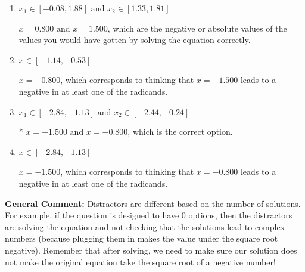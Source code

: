 \documentclass{extbook}[14pt]
\begin{document}
\begin{enumerate}
{\begin{enumerate}[label=\Alph*.]
Corresponds to thinking that $x = -1.500 \text{ and } x = -0.800$ lead to negatives in at least one of the radicands.
\item \( x_1 \in [-0.08, 1.88] \text{ and } x_2 \in [1.33,1.81] \)

$x = 0.800 \text{ and } x = 1.500$, which are the negative or absolute values of the values you would have gotten by solving the equation correctly.
\item \( x \in [-1.14,-0.53] \)

$x = -0.800$, which corresponds to thinking that $x = -1.500$ leads to a negative in at least one of the radicands.
\item \( x_1 \in [-2.84, -1.13] \text{ and } x_2 \in [-2.44,-0.24] \)

* $x = -1.500 \text{ and } x = -0.800$, which is the correct option.
\item \( x \in [-2.84,-1.13] \)

$x = -1.500$, which corresponds to thinking that $x = -0.800$ leads to a negative in at least one of the radicands.
\end{enumerate}

\textbf{General Comment:} Distractors are different based on the number of solutions. For example, if the question is designed to have 0 options, then the distractors are solving the equation and not checking that the solutions lead to complex numbers (because plugging them in makes the value under the square root negative). Remember that after solving, we need to make sure our solution does not make the original equation take the square root of a negative number!
}
\end{enumerate}
\end{document}
